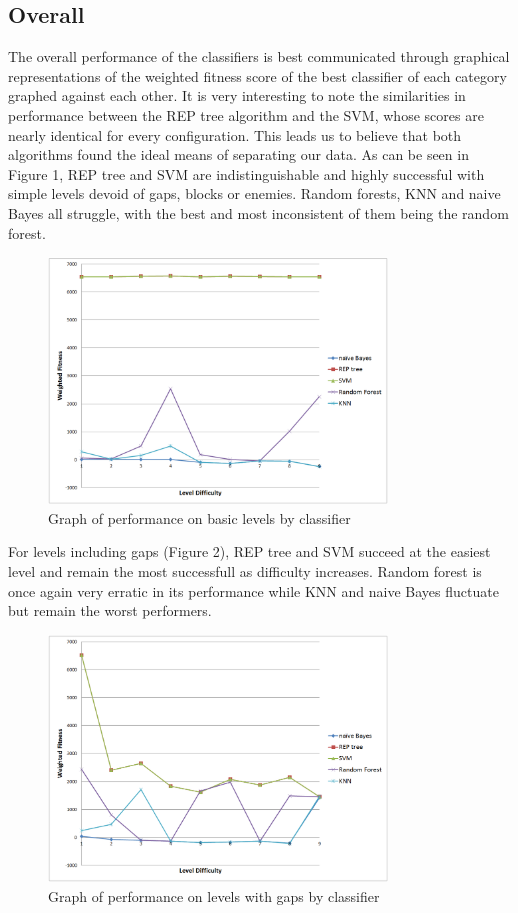 \documentclass[]{article}   %
\begin{document}
\subsection{Overall}

The overall performance of the classifiers is best communicated through graphical representations of the weighted fitness score of the best classifier
of each category graphed against each other. It is very interesting to note the similarities in performance between the REP tree algorithm and the SVM,
whose scores are nearly identical for every configuration. This leads us to believe that both algorithms found the ideal means of separating our data.
\newline\newline
As can be seen in Figure 1, REP tree and SVM are indistinguishable and highly successful with simple levels devoid of gaps, blocks or enemies. Random
forests, KNN and naive Bayes all struggle, with the best and most inconsistent of them being the random forest.
\begin{figure}[H]
\centering
\includegraphics[width=90mm]{basic.png}
\caption{Graph of performance on basic levels by classifier}
\end{figure}

For levels including gaps (Figure 2), REP tree and SVM succeed at the easiest level and remain the most successfull as difficulty increases. Random forest is once again
very erratic in its performance while KNN and naive Bayes fluctuate but remain the worst performers.
\begin{figure}[H]
\centering
\includegraphics[width=90mm]{gaps.png}
\caption{Graph of performance on levels with gaps by classifier}
\end{figure}
\end{document}
